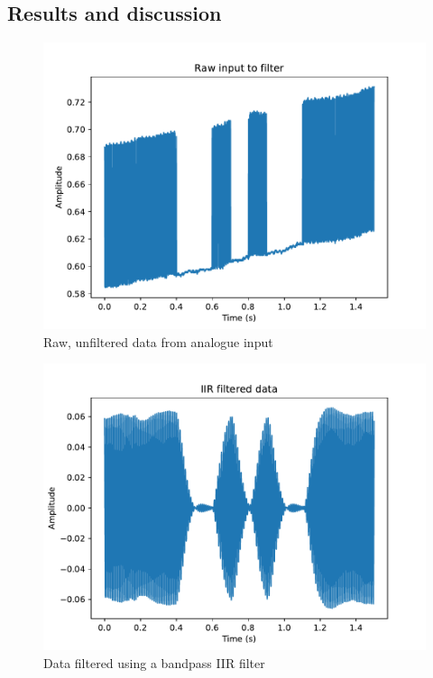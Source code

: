 \documentclass{article}
\begin{document}
\begin{multicols}{2}
\section{Results and discussion}
\begin{figure}[H]
    \includegraphics[width=\linewidth]{figures/raw.pdf}
    \caption{Raw, unfiltered data from analogue input}
    \label{fig:raw}
\end{figure}

\begin{figure}[H]
    \includegraphics[width=\linewidth]{figures/filtered.pdf}
    \caption{Data filtered using a bandpass IIR filter}
    \label{fig:filtered}
\end{figure}


\end{multicols}
\end{document}
